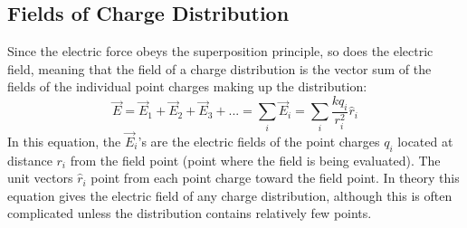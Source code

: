 \documentclass[a4paper]{article}
\begin{document}
\subsection{Fields of Charge Distribution}
Since the electric force obeys the superposition principle, so does the electric field, meaning that the field of a charge distribution is the vector sum of the fields of the individual point charges making up the distribution:
\begin{equation}
    \vec{E} = \vec{E}_1 + \vec{E}_2 + \vec{E}_3 + ... = \sum_i \vec{E}_i = \sum_i \frac{kq_i}{r_i^2}\hat{r}_i
\end{equation}
In this equation, the $\vec{E}_i$'s are the electric fields of the point charges $q_i$ located at distance $r_i$ from the field point (point where the field is being evaluated). The unit vectors $\hat{r}_i$ point from each point charge toward the field point. In theory this equation gives the electric field of any charge distribution, although this is often complicated unless the distribution contains relatively few points.
\end{document}
